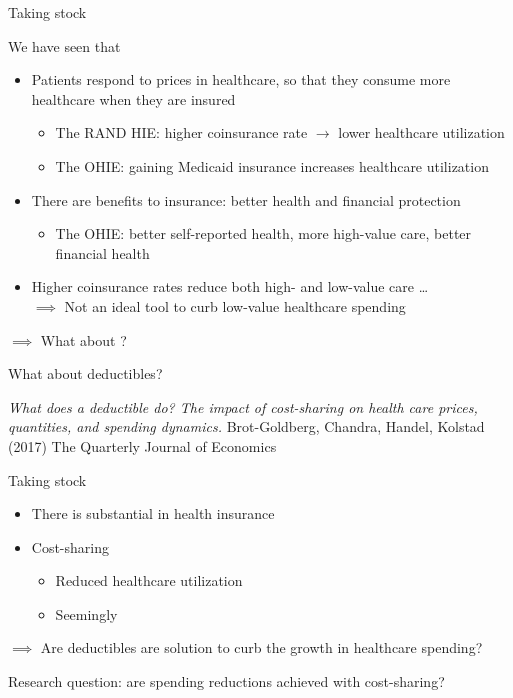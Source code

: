 \begin{frame}{Taking stock}

    We have seen that
    \begin{itemize}
        \item Patients respond to prices in healthcare, so that they consume more healthcare when they are insured
        \begin{itemize}
            \item The RAND HIE: higher coinsurance rate $\rightarrow$ lower healthcare utilization
            \item The OHIE: gaining Medicaid insurance increases healthcare utilization
        \end{itemize}
        \item There are benefits to insurance: better health and financial protection
        \begin{itemize}
            \item The OHIE: better self-reported health, more high-value care, better financial health
        \end{itemize}
        \item Higher coinsurance rates reduce both high- and low-value care \dots\\
        $\implies$ Not an ideal tool to curb low-value healthcare spending
    \end{itemize}
    $\implies$ What about ?

\end{frame}
\begin{frame}{What about deductibles?}

    \footnotesize\textit{What does a deductible do? The impact of cost-sharing on health care prices, quantities, and spending dynamics.}
    Brot-Goldberg, Chandra, Handel, Kolstad (2017) The Quarterly Journal of Economics
    \normalsize
    \vspace{3mm}

    Taking stock
    \begin{itemize}
        \item There is substantial  in health insurance
        \item Cost-sharing
        \begin{itemize}
            \item Reduced healthcare utilization
            \item Seemingly 
        \end{itemize}
    \end{itemize}
    $\implies$ Are deductibles are solution to curb the growth in healthcare spending?
    \vspace{3mm}

    Research question:  are spending reductions achieved with cost-sharing?

\end{frame}

